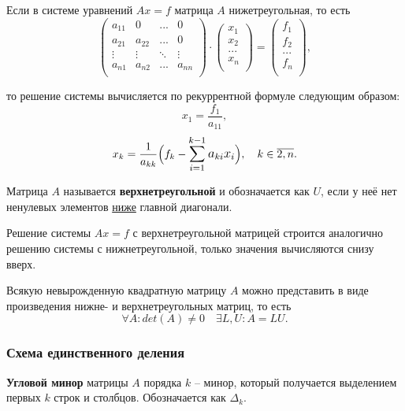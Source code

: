 \documentclass{article}
\begin{document}
Если в системе уравнений $Ax=f$ матрица $A$ нижетреугольная, то есть
\[
	\begin{pmatrix}
		a_{11}	& 0	& ...	& 0 \\
		a_{21}	& a_{22}& ...	& 0 \\
		\vdots	& \vdots&\ddots &\vdots \\
		a_{n1}	& a_{n2}& ...	& a_{nn} \\
	\end{pmatrix}
	\cdot
	\begin{pmatrix}
		x_1 \\
		x_2 \\
		... \\
		x_n \\
	\end{pmatrix}
	=
	\begin{pmatrix}
		f_1 \\
		f_2 \\
		... \\
		f_n \\
	\end{pmatrix}
	,
\]

то решение системы вычисляется по рекуррентной формуле следующим образом:
\[x_1=\frac{f_1}{a_{11}},\]
\[x_k=\frac{1}{a_{kk}}\Big(f_k-\mathlarger{\sum_{i=1}^{k-1}a_{ki}x_i}\Big),
\quad k\in\overline{2,n}.\]

\begin{define}
	Матрица $A$ называется \textbf{верхнетреугольной} и обозначается как
	$U$, если у неё нет ненулевых элементов \underline{ниже} главной
	диагонали.
\end{define}

Решение системы $Ax=f$ с верхнетреугольной матрицей строится аналогично решению
системы с нижнетреугольной, только значения вычисляются снизу вверх.

\begin{theorem}[об LU-разложении]
	Всякую невырожденную квадратную матрицу $A$ можно представить в виде
	произведения нижне- и верхнетреугольных матриц, то есть
	\[\forall A: det(A)\ne 0\quad\exists L,U: A=LU.\]
\end{theorem}

\subsubsection{Схема единственного деления}
\begin{define}
	\textbf{Угловой минор} матрицы $A$ порядка $k$ -- минор, который
	получается выделением первых $k$ строк и столбцов. Обозначается
	как $\Delta_k$.
\end{define}
\end{document}
